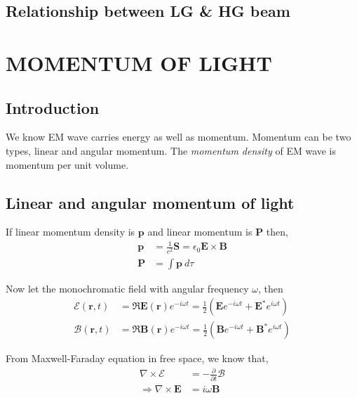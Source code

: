 \documentclass[11pt,a4paper]{article}
\numberwithin{equation}{section}
\begin{document}
\subsection{Relationship between LG \& HG beam}
\cite{beijers allen 93}

\clearpage

\section{MOMENTUM OF LIGHT}

\subsection{Introduction}
We know EM wave carries energy as well as momentum. Momentum can be two types, linear and angular momentum. The \textit{momentum density} of EM wave is momentum per unit volume.

\subsection{Linear and angular momentum of light}
If linear momentum density is $\boldsymbol{p}$ and linear momentum is $\boldsymbol{P}$ then,
\begin{align}
	\boldsymbol{p} &= \frac{1}{c^2}\boldsymbol{S} = \epsilon_0 \boldsymbol{E} \times \boldsymbol{B}\label{eq:3.1}\\
	\boldsymbol{P} &= \int \boldsymbol{p} \:d\tau \label{eq:3.2}
\end{align}

Now let the monochromatic field with angular frequency $\omega$, then
\begin{align}
	\boldsymbol{\mathcal{E}}(\boldsymbol{r},t) &= \Re{\boldsymbol{E}(\boldsymbol{r}) e^{-i \omega t }} = \frac{1}{2}(\boldsymbol{E} e^{-i \omega t } +\boldsymbol{E}^\ast e^{i \omega t})\\
	\boldsymbol{\mathcal{B}}(\boldsymbol{r},t) &= \Re{\boldsymbol{B}(\boldsymbol{r}) e^{-i \omega t }} = \frac{1}{2}(\boldsymbol{B} e^{-i \omega t } +\boldsymbol{B}^\ast e^{i \omega t})
\end{align}

From Maxwell-Faraday equation in free space, we know that, \cite{haus}
\begin{align}
	\nabla\times\boldsymbol{\mathcal{E}}&= - \frac{\partial}{\partial t}\boldsymbol{\mathcal{B}}\\
	\Rightarrow \nabla\times\boldsymbol{E}&= i\omega \boldsymbol{B} \label{eq:3.6}
\end{align}
\end{document}
